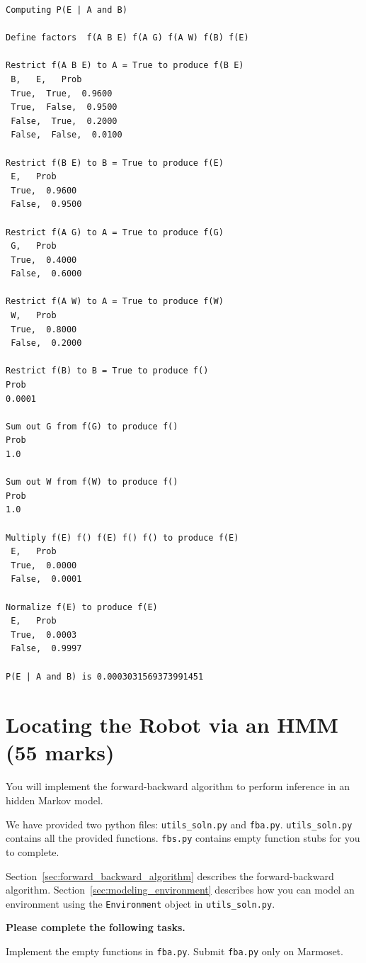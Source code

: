 \documentclass[12pt]{article}
\begin{document}
\begin{verbatim}
Computing P(E | A and B)

Define factors  f(A B E) f(A G) f(A W) f(B) f(E)

Restrict f(A B E) to A = True to produce f(B E)
 B,   E,   Prob
 True,  True,  0.9600
 True,  False,  0.9500
 False,  True,  0.2000
 False,  False,  0.0100

Restrict f(B E) to B = True to produce f(E)
 E,   Prob
 True,  0.9600
 False,  0.9500

Restrict f(A G) to A = True to produce f(G)
 G,   Prob
 True,  0.4000
 False,  0.6000

Restrict f(A W) to A = True to produce f(W)
 W,   Prob
 True,  0.8000
 False,  0.2000

Restrict f(B) to B = True to produce f()
Prob
0.0001

Sum out G from f(G) to produce f()
Prob
1.0

Sum out W from f(W) to produce f()
Prob
1.0

Multiply f(E) f() f(E) f() f() to produce f(E)
 E,   Prob
 True,  0.0000
 False,  0.0001

Normalize f(E) to produce f(E)
 E,   Prob
 True,  0.0003
 False,  0.9997

P(E | A and B) is 0.0003031569373991451
\end{verbatim}



\newpage
\section{Locating the Robot via an HMM (55 marks)}

You will implement the forward-backward algorithm to perform inference in an hidden Markov model. 

We have provided two python files: \verb+utils_soln.py+ and \verb+fba.py+.  \verb+utils_soln.py+ contains all the provided functions. \verb+fbs.py+ contains empty function stubs for you to complete.

Section~\ref{sec:forward_backward_algorithm} describes the forward-backward algorithm. Section~\ref{sec:modeling_environment} describes how you can model an environment using the \verb+Environment+ object in \verb+utils_soln.py+. 


{\bf Please complete the following tasks.}

Implement the empty functions in \verb+fba.py+. Submit \verb+fba.py+ only on Marmoset.
    
\end{document}
